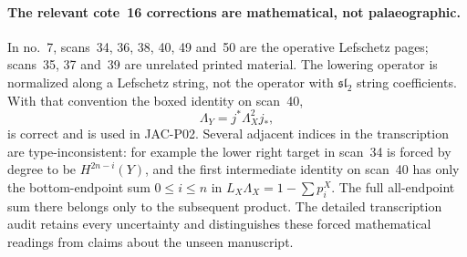 \paragraph{The relevant cote~16 corrections are mathematical, not palaeographic.}
In no.~7, scans~34, 36, 38, 40, 49 and~50 are the operative
Lefschetz pages; scans~35, 37 and~39 are unrelated printed
material. The lowering operator is normalized along a Lefschetz
string, not the operator with $\mathfrak{sl}_2$ string
coefficients. With that convention the boxed identity on scan~40,
\[
             \Lambda_Y=j^*\Lambda_X^2j_*,
\]
is correct and is used in JAC-P02. Several adjacent indices in
the transcription are type-inconsistent: for example the lower
right target in scan~34 is forced by degree to be
$H^{2n-i}(Y)$, and the first intermediate identity on scan~40
has only the bottom-endpoint sum $0\le i\le n$ in
$L_X\Lambda_X=1-\sum p_i^X$. The full all-endpoint sum there
belongs only to the subsequent product. The detailed
transcription audit retains every uncertainty and distinguishes
these forced mathematical readings from claims about the
unseen manuscript.
